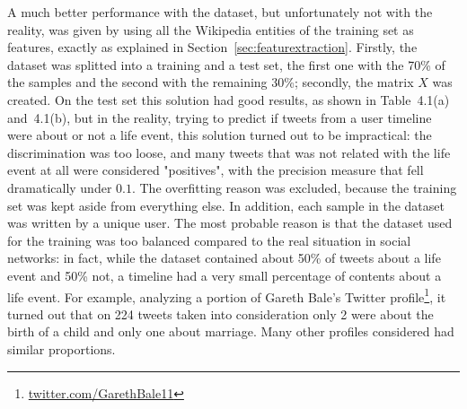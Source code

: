 \begin{table}[htbp]
\centering
{}\qquad\qquad
{}
\caption{The performance of the naive bayes were satisfactory on a very balanced dataset, but not with an unbalance situation. Unfortunatly, users' timelines are very unbalanced, and this classifier turned out to be inappropriate.}
\end{table}

A much better performance with the dataset, but unfortunately not with the reality, was given by using all the Wikipedia entities of the training set as features, exactly as explained in Section~\ref{sec:featurextraction}. Firstly, the dataset was splitted into a training and a test set, the first one with the 70\% of the samples and the second with the remaining 30\%; secondly, the matrix $X$ was created. On the test set this solution had good results, as shown in Table~4.1(a) and~4.1(b), but in the reality, trying to predict if tweets from a user timeline were about or not a life event, this solution turned out to be impractical: the discrimination was too loose, and many tweets that was not related with the life event at all were considered "positives", with the precision measure that fell dramatically under $0.1$. The overfitting reason was excluded, because the training set was kept aside from everything else. In addition, each sample in the dataset was written by a unique user. The most probable reason is that the dataset used for the training was too balanced compared to the real situation in social networks: in fact, while the dataset contained about 50\% of tweets about a life event and 50\% not, a timeline had a very small percentage of contents about a life event. For example, analyzing a portion of Gareth Bale's Twitter profile\footnote{\url{twitter.com/GarethBale11}}, it turned out that on 224 tweets taken into consideration only 2 were about the birth of a child and only one about marriage. Many other profiles considered had similar proportions.


